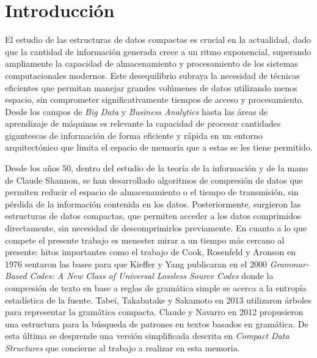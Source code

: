 \chapter{Introducción}

El estudio de las estructuras de datos compactas es crucial en la actualidad, dado que la cantidad de información generada crece a un ritmo exponencial\cite{statista_data_growth}\cite{we_are_social_2024}, superando ampliamente la capacidad de almacenamiento y procesamiento de los sistemas computacionales modernos. Este desequilibrio subraya la necesidad de técnicas eficientes que permitan manejar grandes volúmenes de datos utilizando menos espacio, sin comprometer significativamente tiempos de acceso y procesamiento. Desde los campos de \textit{Big Data} y \textit{Business Analytics} hasta las áreas de aprendizaje de máquinas es relevante la capacidad de procesar cantidades gigantescas de información de forma eficiente y rápida en un entorno arquitectónico que limita el espacio de memoria que a estas se les tiene permitido. 

Desde los años 50, dentro del estudio de la teoría de la información y de la mano de Claude Shannon, se han desarrollado algoritmos de compresión de datos que permiten reducir el espacio de almacenamiento o el tiempo de transmisión, sin pérdida de la información contenida en los datos. Posteriormente, surgieron las estructuras de datos compactas, que permiten acceder a los datos comprimidos directamente, sin necesidad de descomprimirlos previamente. En cuanto a lo que compete el presente trabajo es menester mirar a un tiempo más cercano al presente: hitos importantes como el trabajo de Cook, Rosenfeld y Aronson \cite{COOK197659} en 1976 sentaron las bases para que  Kieffer y Yang publicaran en el 2000 \textit{Grammar-Based Codes: A New Class of Universal Lossless Source Codes} \cite{841160} donde la compresión de texto en base a reglas de gramática simple se acerca a la entropía estadística de la fuente. Tabei, Takabatake y Sakamoto en 2013 utilizaron árboles para representar la gramática compacta\cite{Tabei2013}. Claude y Navarro en 2012 propusieron una estructura para la búsqueda de patrones en textos basados en gramática\cite{Claude2012}. De esta última se desprende una versión simplificada descrita en \textit{Compact Data Structures} \cite[Capítulo 10.5.6]{Navarro} que concierne al trabajo a realizar en esta memoria.

